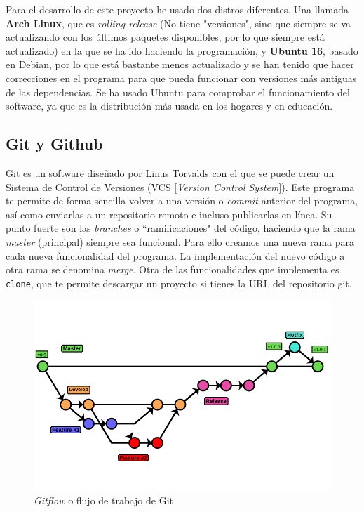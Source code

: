 \documentclass[a4paper, 11pt]{report} %
\begin{document}
\newpage
Para el desarrollo de este proyecto he usado dos distros diferentes. Una llamada \textbf{Arch Linux}, que es \textit{rolling release} (No tiene "versiones", sino que siempre se va actualizando con los últimos paquetes disponibles, por lo que siempre está actualizado) en la que se ha ido haciendo la programación, y \textbf{Ubuntu 16}, basado en Debian, por lo que está bastante menos actualizado y se han tenido que hacer correcciones en el programa para que pueda funcionar con versiones más antiguas de las \glspl{dependencia}. Se ha usado Ubuntu para comprobar el funcionamiento del software, ya que es la distribución más usada en los hogares y en educación.

\subsection{Git y Github}
Git es un software diseñado por Linus Torvalds con el que se puede crear un Sistema de
Control de Versiones (VCS [\textit{Version Control System}]). Este programa te permite
de forma sencilla volver a una versión o \textit{commit} anterior del programa, así
como enviarlas a un \gls{repositorio} remoto e incluso publicarlas en línea. Su punto fuerte
son las \textit{branches} o ``ramificaciones" del código, haciendo que la rama
\textit{master} (principal) siempre sea funcional. Para ello creamos una nueva rama para cada nueva funcionalidad del programa. La implementación del nuevo código a otra rama se denomina \textit{merge}. Otra de las funcionalidades que implementa es \texttt{clone}, que te permite descargar un proyecto si tienes la URL del \gls{repositorio} git.
\begin{figure}[H]
\noindent
\includegraphics[width=\textwidth]{Resources/Gitflow.png}
\caption{\textit{Gitflow} o flujo de trabajo de Git}
\end{figure}
\end{document}
